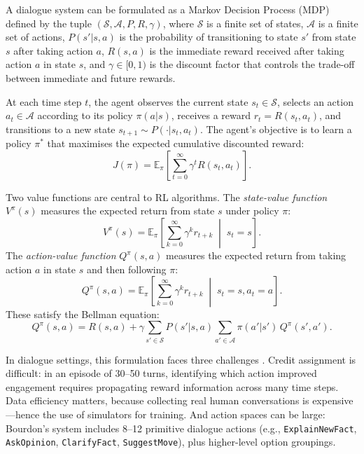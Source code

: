 \documentclass[a4paper, 11pt]{article}
\begin{document}
A dialogue system can be formulated as a Markov Decision Process (MDP) defined by the tuple $(\mathcal{S}, \mathcal{A}, P, R, \gamma)$, where $\mathcal{S}$ is a finite set of states, $\mathcal{A}$ is a finite set of actions, $P(s' | s, a)$ is the probability of transitioning to state $s'$ from state $s$ after taking action $a$, $R(s, a)$ is the immediate reward received after taking action $a$ in state $s$, and $\gamma \in [0, 1)$ is the discount factor that controls the trade-off between immediate and future rewards.

At each time step $t$, the agent observes the current state $s_t \in \mathcal{S}$, selects an action $a_t \in \mathcal{A}$ according to its policy $\pi(a | s)$, receives a reward $r_t = R(s_t, a_t)$, and transitions to a new state $s_{t+1} \sim P(\cdot | s_t, a_t)$. The agent's objective is to learn a policy $\pi^*$ that maximises the expected cumulative discounted reward:
\begin{equation}
  \label{eq:objective}
  J(\pi) = \mathbb{E}_\pi \left[ \sum_{t=0}^{\infty} \gamma^t R(s_t, a_t) \right].
\end{equation}

Two value functions are central to RL algorithms. The \emph{state-value function} $V^\pi(s)$ measures the expected return from state $s$ under policy $\pi$:
\begin{equation}
  \label{eq:value_function}
  V^\pi(s) = \mathbb{E}_\pi \left[ \sum_{k=0}^{\infty} \gamma^k r_{t+k} \;\middle|\; s_t = s \right].
\end{equation}
The \emph{action-value function} $Q^\pi(s, a)$ measures the expected return from taking action $a$ in state $s$ and then following $\pi$:
\begin{equation}
  \label{eq:q_function}
  Q^\pi(s, a) = \mathbb{E}_\pi \left[ \sum_{k=0}^{\infty} \gamma^k r_{t+k} \;\middle|\; s_t = s, a_t = a \right].
\end{equation}
These satisfy the Bellman equation:
\begin{equation}
  \label{eq:bellman}
  Q^\pi(s, a) = R(s, a) + \gamma \sum_{s' \in \mathcal{S}} P(s' | s, a) \sum_{a' \in \mathcal{A}} \pi(a' | s') \, Q^\pi(s', a').
\end{equation}

In dialogue settings, this formulation faces three challenges \citep{bourdon2024thesis}. Credit assignment is difficult: in an episode of 30--50 turns, identifying which action improved engagement requires propagating reward information across many time steps. Data efficiency matters, because collecting real human conversations is expensive---hence the use of simulators for training. And action spaces can be large: Bourdon's system includes 8--12 primitive dialogue actions (e.g., \texttt{ExplainNewFact}, \texttt{AskOpinion}, \texttt{ClarifyFact}, \texttt{SuggestMove}), plus higher-level option groupings.
\end{document}

